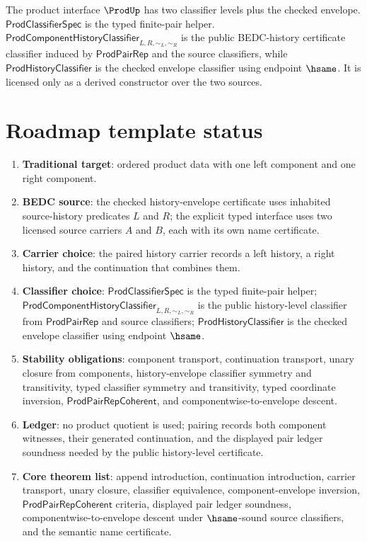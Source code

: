 The product interface $\ProdUp$ has two classifier levels plus the checked envelope. $\mathsf{ProdClassifierSpec}$ is the typed finite-pair helper. $\mathsf{ProdComponentHistoryClassifier}_{L,R,\sim_L,\sim_R}$ is the public BEDC-history certificate classifier induced by $\mathsf{ProdPairRep}$ and the source classifiers, while $\mathsf{ProdHistoryClassifier}$ is the checked envelope classifier using endpoint $\hsame$. It is licensed only as a derived constructor over the two sources.

\section{Roadmap template status}

\begin{enumerate}
  \item \textbf{Traditional target}: ordered product data with one left component and one right component.
  \item \textbf{BEDC source}: the checked history-envelope certificate uses inhabited source-history predicates $L$ and $R$; the explicit typed interface uses two licensed source carriers $A$ and $B$, each with its own name certificate.
  \item \textbf{Carrier choice}: the paired history carrier records a left history, a right history, and the continuation that combines them.
  \item \textbf{Classifier choice}: $\mathsf{ProdClassifierSpec}$ is the typed finite-pair helper; $\mathsf{ProdComponentHistoryClassifier}_{L,R,\sim_L,\sim_R}$ is the public history-level classifier from $\mathsf{ProdPairRep}$ and source classifiers; $\mathsf{ProdHistoryClassifier}$ is the checked envelope classifier using endpoint $\hsame$.
  \item \textbf{Stability obligations}: component transport, continuation transport, unary closure from components, history-envelope classifier symmetry and transitivity, typed classifier symmetry and transitivity, typed coordinate inversion, $\mathsf{ProdPairRepCoherent}$, and componentwise-to-envelope descent.
  \item \textbf{Ledger}: no product quotient is used; pairing records both component witnesses, their generated continuation, and the displayed pair ledger soundness needed by the public history-level certificate.
  \item \textbf{Core theorem list}: append introduction, continuation introduction, carrier transport, unary closure, classifier equivalence, component-envelope inversion, $\mathsf{ProdPairRepCoherent}$ criteria, displayed pair ledger soundness, componentwise-to-envelope descent under $\hsame$-sound source classifiers, and the semantic name certificate.

\end{enumerate}
